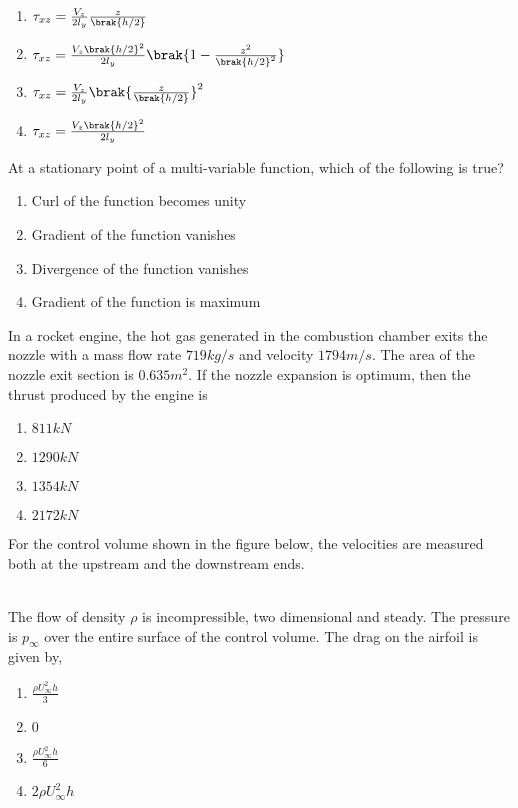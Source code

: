 		\begin{enumerate}
			\item $\tau_{xz} = \frac{V_z}{2l_y}\frac{z}{\brak{h/2}}$
			\item $\tau_{xz} = \frac{V_z\brak{h/2}^2}{2l_y}\brak{1-\frac{z^2}{\brak{h/2}^2}}$
			\item $\tau_{xz} = \frac{V_z}{2l_y}\brak{\frac{z}{\brak{h/2}}}^2$
			\item $\tau_{xz} = \frac{V_z\brak{h/2}^2}{2l_y}$
		\end{enumerate}
	\item At a stationary point of a multi-variable function, which of the following is true?
		\begin{enumerate}
			\item Curl of the function becomes unity
			\item Gradient of the function vanishes
			\item Divergence of the function vanishes
			\item Gradient of the function is maximum
		\end{enumerate}
	\item In a rocket engine, the hot gas generated in the combustion chamber exits the nozzle with a mass flow rate $719 kg/s$ and velocity $1794 m/s$. The area of the nozzle exit section is $0.635 m^2$. If the nozzle expansion is optimum, then the thrust produced by the engine is 
		\begin{enumerate}
			\item $811 kN$
			\item $1290 kN$
			\item $1354 kN$
			\item $2172 kN$
		\end{enumerate}
	\item For the control volume shown in the figure below, the velocities are measured both at the upstream and the downstream ends.
		\begin{figure}[h!]
			
		\end{figure}\\
		The flow of density $\rho$ is incompressible, two dimensional and steady. The pressure is $p_{\infty}$ over the entire surface of the control volume. The drag on the airfoil is given by,
		\begin{enumerate}
			\item $\frac{\rho U^2_{\infty}h}{3}$
			\item $0$
			\item $\frac{\rho U^2_{\infty}h}{6}$
			\item $2\rho U^2_{\infty}h$
		\end{enumerate}
